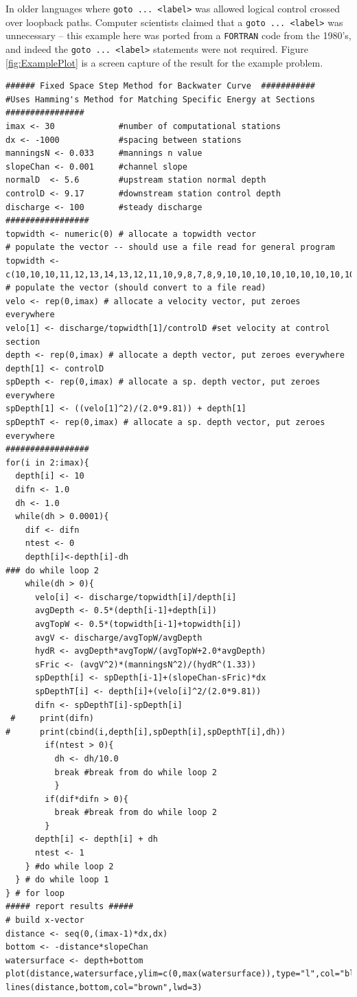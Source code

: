 In older languages where \texttt{goto ... <label>} was allowed logical control crossed over loopback paths.  
Computer scientists claimed that a  \texttt{goto ... <label>} was unnecessary -- this example here was ported from a \texttt{FORTRAN} code from the 1980's, and indeed the  \texttt{goto ... <label>} statements were not required.
Figure \ref{fig:ExamplePlot} is a screen capture of the result for the example problem.  
\clearpage
\begin{lstlisting}[caption=R script for Backwater Curve by Fixed Space Method \\ , label=lst:FixedSpaceMethod]
###### Fixed Space Step Method for Backwater Curve  ###########
#Uses Hamming's Method for Matching Specific Energy at Sections
################
imax <- 30             #number of computational stations
dx <- -1000            #spacing between stations
manningsN <- 0.033     #mannings n value
slopeChan <- 0.001     #channel slope
normalD  <- 5.6        #upstream station normal depth
controlD <- 9.17       #downstream station control depth
discharge <- 100       #steady discharge
#################
topwidth <- numeric(0) # allocate a topwidth vector
# populate the vector -- should use a file read for general program
topwidth <- c(10,10,10,11,12,13,14,13,12,11,10,9,8,7,8,9,10,10,10,10,10,10,10,10,10,10,10,10,10,10)
# populate the vector (should convert to a file read)
velo <- rep(0,imax) # allocate a velocity vector, put zeroes everywhere
velo[1] <- discharge/topwidth[1]/controlD #set velocity at control section
depth <- rep(0,imax) # allocate a depth vector, put zeroes everywhere
depth[1] <- controlD
spDepth <- rep(0,imax) # allocate a sp. depth vector, put zeroes everywhere
spDepth[1] <- ((velo[1]^2)/(2.0*9.81)) + depth[1]
spDepthT <- rep(0,imax) # allocate a sp. depth vector, put zeroes everywhere
#################
for(i in 2:imax){
  depth[i] <- 10
  difn <- 1.0
  dh <- 1.0
  while(dh > 0.0001){
    dif <- difn
    ntest <- 0
    depth[i]<-depth[i]-dh
### do while loop 2
    while(dh > 0){
      velo[i] <- discharge/topwidth[i]/depth[i]
      avgDepth <- 0.5*(depth[i-1]+depth[i])
      avgTopW <- 0.5*(topwidth[i-1]+topwidth[i])
      avgV <- discharge/avgTopW/avgDepth
      hydR <- avgDepth*avgTopW/(avgTopW+2.0*avgDepth)
      sFric <- (avgV^2)*(manningsN^2)/(hydR^(1.33))
      spDepth[i] <- spDepth[i-1]+(slopeChan-sFric)*dx
      spDepthT[i] <- depth[i]+(velo[i]^2/(2.0*9.81))
      difn <- spDepthT[i]-spDepth[i]
 #     print(difn)
#      print(cbind(i,depth[i],spDepth[i],spDepthT[i],dh))
        if(ntest > 0){
          dh <- dh/10.0
          break #break from do while loop 2
          }
        if(dif*difn > 0){
          break #break from do while loop 2
        }
      depth[i] <- depth[i] + dh
      ntest <- 1
    } #do while loop 2
  } # do while loop 1
} # for loop
##### report results #####
# build x-vector
distance <- seq(0,(imax-1)*dx,dx)
bottom <- -distance*slopeChan
watersurface <- depth+bottom
plot(distance,watersurface,ylim=c(0,max(watersurface)),type="l",col="blue",lwd=3)
lines(distance,bottom,col="brown",lwd=3)
\end{lstlisting} 

